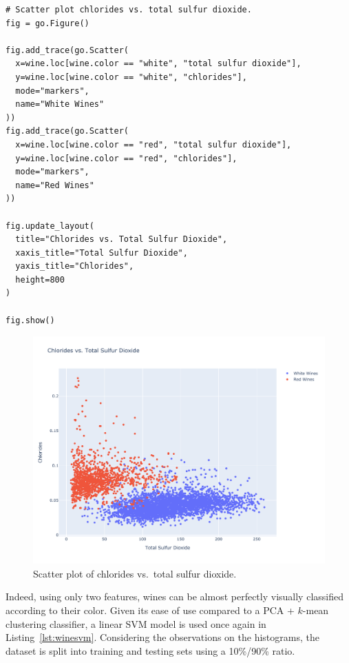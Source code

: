 \documentclass[12pt]{article}
\begin{document}
  \begin{lstlisting}[caption={Scatter plot of chlorides vs.\ total sulfur
    dioxide.}, captionpos=b, label={lst:scatterwines}]
# Scatter plot chlorides vs. total sulfur dioxide.
fig = go.Figure()

fig.add_trace(go.Scatter(
  x=wine.loc[wine.color == "white", "total sulfur dioxide"],
  y=wine.loc[wine.color == "white", "chlorides"],
  mode="markers",
  name="White Wines"
))
fig.add_trace(go.Scatter(
  x=wine.loc[wine.color == "red", "total sulfur dioxide"],
  y=wine.loc[wine.color == "red", "chlorides"],
  mode="markers",
  name="Red Wines"
))

fig.update_layout(
  title="Chlorides vs. Total Sulfur Dioxide",
  xaxis_title="Total Sulfur Dioxide",
  yaxis_title="Chlorides",
  height=800
)

fig.show()
  \end{lstlisting}

  \begin{figure}[!ht]
    \centering
    \includegraphics[width=\textwidth]{figures/scatterwines}
    \caption{Scatter plot of chlorides vs.\ total sulfur dioxide.}%
    \label{fig:scatterwines}
  \end{figure} 

  Indeed, using only two features, wines can be almost perfectly visually
  classified according to their color. Given its ease of use compared to a PCA
  + $k$-mean clustering classifier, a linear SVM model is used once again in
  Listing~\ref{lst:winesvm}.  Considering the observations on the histograms,
  the dataset is split into training and testing sets using a 10\%/90\% ratio.
\end{document}
